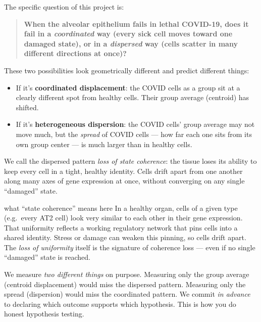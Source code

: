 \documentclass[11pt]{article}
\begin{document}
The specific question of this project is:

\begin{quote}
\textbf{When the alveolar epithelium fails in lethal COVID-19, does it fail in a \emph{coordinated} way (every sick cell moves toward one damaged state), or in a \emph{dispersed} way (cells scatter in many different directions at once)?}
\end{quote}

These two possibilities look geometrically different and predict different things:

\begin{itemize}
\item If it's \textbf{coordinated displacement}: the COVID cells as a group sit at a clearly different spot from healthy cells. Their group average (centroid) has shifted.
\item If it's \textbf{heterogeneous dispersion}: the COVID cells' group average may not move much, but the \emph{spread} of COVID cells --- how far each one sits from its own group center --- is much larger than in healthy cells.
\end{itemize}

We call the dispersed pattern \emph{loss of state coherence}: the tissue loses its ability to keep every cell in a tight, healthy identity. Cells drift apart from one another along many axes of gene expression at once, without converging on any single ``damaged'' state.

\begin{jargon}{what ``state coherence'' means here}
In a healthy organ, cells of a given type (e.g.\ every AT2 cell) look very similar to each other in their gene expression. That uniformity reflects a working regulatory network that pins cells into a shared identity. Stress or damage can weaken this pinning, so cells drift apart. The \emph{loss of uniformity} itself is the signature of coherence loss --- even if no single ``damaged'' state is reached.
\end{jargon}

\begin{whyblock}
We measure \emph{two different things} on purpose. Measuring only the group average (centroid displacement) would miss the dispersed pattern. Measuring only the spread (dispersion) would miss the coordinated pattern. We commit \emph{in advance} to declaring which outcome supports which hypothesis. This is how you do honest hypothesis testing.
\end{whyblock}
\end{document}
